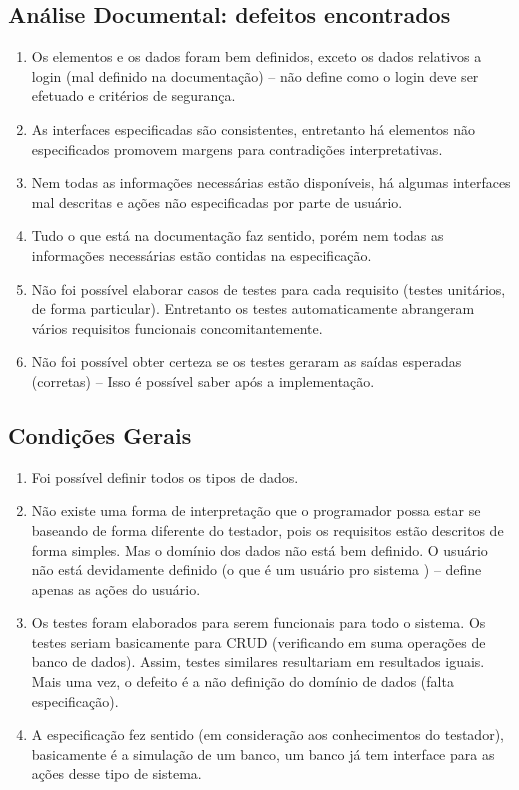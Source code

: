 \documentclass[12pt,a4paper]{article}
\begin{document}
		\subsection{Análise Documental: defeitos encontrados}
		\begin{enumerate}
		\item Os elementos e os dados foram bem definidos, exceto os dados relativos a login (mal definido na documentação) -- não define como o login deve ser efetuado e critérios de segurança.
		\item As interfaces especificadas são consistentes, entretanto há elementos não especificados promovem margens para contradições interpretativas.
		\item Nem todas as informações necessárias estão disponíveis, há algumas interfaces mal descritas e ações não especificadas por parte de usuário.
		\item Tudo o que está na documentação faz sentido, porém nem todas as informações necessárias estão contidas na especificação.
		\item Não foi possível elaborar casos de testes para cada requisito (testes unitários, de forma particular). Entretanto os testes automaticamente abrangeram vários requisitos funcionais concomitantemente.
		\item Não foi possível obter certeza se os testes geraram as saídas esperadas (corretas) -- Isso é possível saber após a implementação.
	\end{enumerate}
	\subsection{Condições Gerais}
		\begin{enumerate}
		\item Foi possível definir todos os tipos de dados.
	
	
	
	
	
	
	
	
	\item Não existe uma forma de interpretação que o programador possa estar se baseando de forma diferente do testador, pois os requisitos estão descritos de forma simples. Mas o domínio dos dados não está bem definido. O usuário não está devidamente definido (o que é um usuário pro sistema ) -- define apenas as ações do usuário. 
	
	\item Os testes foram elaborados para serem funcionais para todo o sistema. Os testes seriam basicamente para CRUD (verificando em suma operações de banco de dados). Assim, testes similares resultariam em resultados iguais. Mais uma vez, o defeito é a não definição do domínio de dados (falta especificação).
	
	\item A especificação fez sentido (em consideração aos conhecimentos do testador), basicamente é a simulação de um banco, um banco já tem interface para as ações desse tipo de sistema. 
	\end{enumerate}
		\newpage
\end{document}
